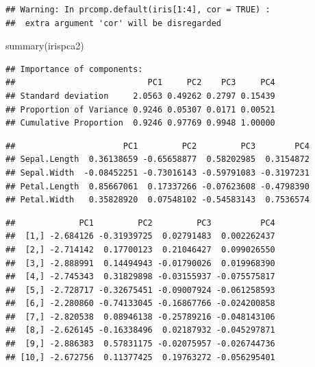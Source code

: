 \documentclass[
]{article}
\newenvironment{Shaded}{\begin{snugshade}}{\end{snugshade}}
\newcommand{\DecValTok}[1]{\textcolor[rgb]{0.00,0.00,0.81}{#1}}
\newcommand{\FunctionTok}[1]{\textcolor[rgb]{0.00,0.00,0.00}{#1}}
\newcommand{\NormalTok}[1]{#1}
\newcommand{\SpecialCharTok}[1]{\textcolor[rgb]{0.00,0.00,0.00}{#1}}
\theoremstyle{definition}
\theoremstyle{definition}
\theoremstyle{definition}
\theoremstyle{definition}
\theoremstyle{remark}
\begin{document}
\begin{verbatim}
## Warning: In prcomp.default(iris[1:4], cor = TRUE) :
##  extra argument 'cor' will be disregarded
\end{verbatim}

\begin{Shaded}
\begin{Highlighting}[]
\FunctionTok{summary}\NormalTok{(irispca2)}
\end{Highlighting}
\end{Shaded}

\begin{verbatim}
## Importance of components:
##                           PC1     PC2    PC3     PC4
## Standard deviation     2.0563 0.49262 0.2797 0.15439
## Proportion of Variance 0.9246 0.05307 0.0171 0.00521
## Cumulative Proportion  0.9246 0.97769 0.9948 1.00000
\end{verbatim}

\begin{Shaded}
\end{Shaded}

\begin{verbatim}
##                      PC1         PC2         PC3        PC4
## Sepal.Length  0.36138659 -0.65658877  0.58202985  0.3154872
## Sepal.Width  -0.08452251 -0.73016143 -0.59791083 -0.3197231
## Petal.Length  0.85667061  0.17337266 -0.07623608 -0.4798390
## Petal.Width   0.35828920  0.07548102 -0.54583143  0.7536574
\end{verbatim}

\begin{Shaded}
\end{Shaded}

\begin{verbatim}
##             PC1         PC2         PC3          PC4
##  [1,] -2.684126 -0.31939725  0.02791483  0.002262437
##  [2,] -2.714142  0.17700123  0.21046427  0.099026550
##  [3,] -2.888991  0.14494943 -0.01790026  0.019968390
##  [4,] -2.745343  0.31829898 -0.03155937 -0.075575817
##  [5,] -2.728717 -0.32675451 -0.09007924 -0.061258593
##  [6,] -2.280860 -0.74133045 -0.16867766 -0.024200858
##  [7,] -2.820538  0.08946138 -0.25789216 -0.048143106
##  [8,] -2.626145 -0.16338496  0.02187932 -0.045297871
##  [9,] -2.886383  0.57831175 -0.02075957 -0.026744736
## [10,] -2.672756  0.11377425  0.19763272 -0.056295401
\end{verbatim}
\end{document}
